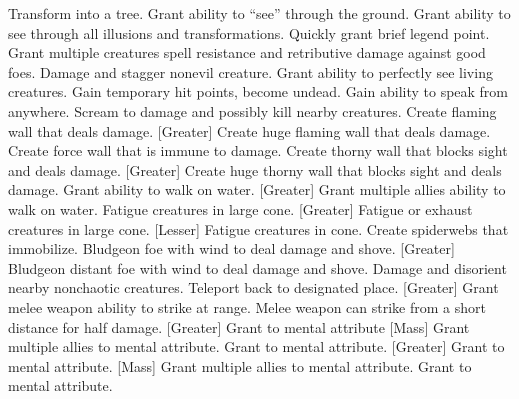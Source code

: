     {Transform into a tree.}
    {Grant ability to ``see'' through the ground.}
    {Grant ability to see through all illusions and transformations.}
    {Quickly grant brief legend point.}
    {Grant multiple creatures spell resistance and retributive damage against good foes.}
    {Damage and stagger nonevil creature.}
    {Grant ability to perfectly see living creatures.}
    {Gain temporary hit points, become undead.}
    {Gain ability to speak from anywhere.}
    {Scream to damage and possibly kill nearby creatures.}
    {Create flaming wall that deals damage.}
[Greater]
    {Create huge flaming wall that deals damage.}
    {Create force wall that is immune to damage.}
    {Create thorny wall that blocks sight and deals damage.}
[Greater]
    {Create huge thorny wall that blocks sight and deals damage.}
    {Grant ability to walk on water.}
[Greater]
    {Grant multiple allies ability to walk on water.}
    {Fatigue creatures in large cone.}
[Greater]
    {Fatigue or exhaust creatures in large cone.}
[Lesser]
    {Fatigue creatures in cone.}
    {Create spiderwebs that immobilize.}
    {Bludgeon foe with wind to deal damage and shove.}
[Greater]
    {Bludgeon distant foe with wind to deal damage and shove.}
    {Damage and disorient nearby nonchaotic creatures.}
    {Teleport back to designated place.}
[Greater]
    {Grant melee weapon ability to strike at range.}
    {Melee weapon can strike from a short distance for half damage.}
[Greater]
    {Grant  to mental attribute}
[Mass]
    {Grant multiple allies  to mental attribute.}
    {Grant  to mental attribute.}
[Greater]
    {Grant  to mental attribute.}
[Mass]
    {Grant multiple allies  to mental attribute.}
    {Grant  to mental attribute.}

